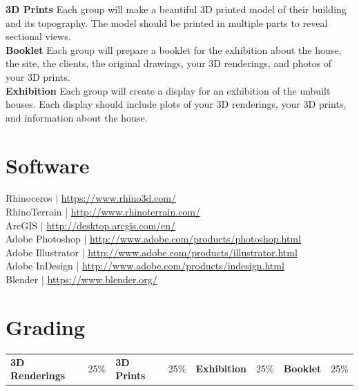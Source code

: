 \documentclass[11pt,article,oneside]{memoir}
\begin{document}
\noindent \textbf{3D Prints}
Each group will make a beautiful 3D printed model 
of their building and its topography.
The model should be printed in multiple parts
to reveal sectional views.\\

\noindent \textbf{Booklet}
Each group will prepare a booklet for the exhibition 
about the house, the site, the clients, the original drawings, 
your 3D renderings, and photos of your 3D prints.\\

\noindent \textbf{Exhibition}
Each group will create a display for 
an exhibition of the unbuilt houses.
Each display should include
plots of your 3D renderings,
your 3D prints, and 
information about the house.\\

\clearpage

\section{Software}
Rhinoceros | \url{https://www.rhino3d.com/}\\
RhinoTerrain | \url{http://www.rhinoterrain.com/}\\
ArcGIS | \url{http://desktop.arcgis.com/en/}\\
Adobe Photoshop | \url{http://www.adobe.com/products/photoshop.html}\\
Adobe Illustrator | \url{http://www.adobe.com/products/illustrator.html}\\
Adobe InDesign | \url{http://www.adobe.com/products/indesign.html}\\
Blender | \url{https://www.blender.org/}\\

\section{Grading}

\begin{table}[H]
\small
\begin{tabular}{l l l l l l l l}
\textbf{3D Renderings} & 25\% &
\textbf{3D Prints} & 25\% &
\textbf{Exhibition} & 25\% &
\textbf{Booklet} & 25\% \\
\end{tabular}
\end{table}
\end{document}
